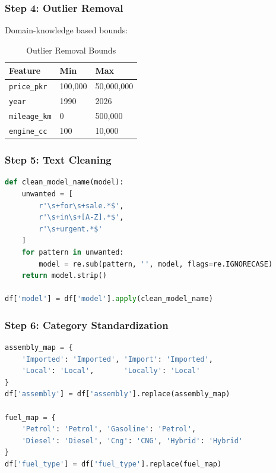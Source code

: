 \documentclass[12pt,a4paper]{article}
\begin{document}
\subsubsection{Step 4: Outlier Removal}

Domain-knowledge based bounds:

\begin{table}[H]
\centering
\caption{Outlier Removal Bounds}
\begin{tabular}{@{}lll@{}}
\toprule
\textbf{Feature} & \textbf{Min} & \textbf{Max} \\ \midrule
\texttt{price\_pkr}  & 100,000 & 50,000,000 \\
\texttt{year}        & 1990    & 2026 \\
\texttt{mileage\_km} & 0       & 500,000 \\
\texttt{engine\_cc}  & 100     & 10,000 \\ \bottomrule
\end{tabular}
\end{table}

\subsubsection{Step 5: Text Cleaning}

\begin{lstlisting}[language=Python, caption=Model Name Cleaning]
def clean_model_name(model):
    unwanted = [
        r'\s+for\s+sale.*$',
        r'\s+in\s+[A-Z].*$',
        r'\s+urgent.*$'
    ]
    for pattern in unwanted:
        model = re.sub(pattern, '', model, flags=re.IGNORECASE)
    return model.strip()

df['model'] = df['model'].apply(clean_model_name)
\end{lstlisting}

\subsubsection{Step 6: Category Standardization}

\begin{lstlisting}[language=Python, caption=Category Mapping]
assembly_map = {
    'Imported': 'Imported', 'Import': 'Imported',
    'Local': 'Local',       'Locally': 'Local'
}
df['assembly'] = df['assembly'].replace(assembly_map)

fuel_map = {
    'Petrol': 'Petrol', 'Gasoline': 'Petrol',
    'Diesel': 'Diesel', 'Cng': 'CNG', 'Hybrid': 'Hybrid'
}
df['fuel_type'] = df['fuel_type'].replace(fuel_map)
\end{lstlisting}
\end{document}
